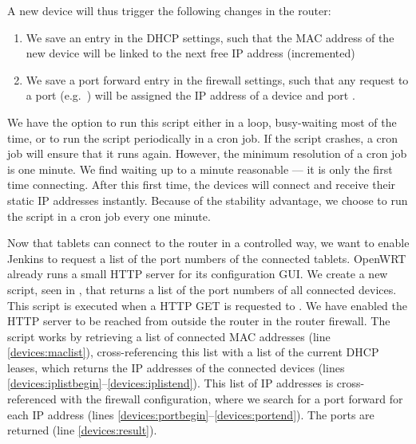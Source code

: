 A new device will thus trigger the following changes in the router:
\begin{enumerate}
  \item We save an entry in the DHCP settings, such that the MAC address of the new device will be linked to the next free IP address (incremented)
  \item We save a port forward entry in the firewall settings, such that any request to a port (e.g.\ ) will be assigned the IP address of a device and port .
\end{enumerate}

We have the option to run this script either in a loop, busy-waiting most of the time, or to run the script periodically in a cron job. If the script crashes, a cron job will ensure that it runs again. However, the minimum resolution of a cron job is one minute. We find waiting up to a minute reasonable --- it is only the first time connecting. After this first time, the devices will connect and receive their static IP addresses instantly. Because of the stability advantage, we choose to run the script in a cron job every one minute.




Now that tablets can connect to the router in a controlled way, we want to enable Jenkins to request a list of the port numbers of the connected tablets. OpenWRT already runs a small HTTP server for its configuration GUI\@. We create a new script, seen in , that returns a list of the port numbers of all connected devices. This script is executed when a HTTP GET is requested to . We have enabled the HTTP server to be reached from outside the router in the router firewall. The script works by retrieving a list of connected MAC addresses (line \ref{devices:maclist}), cross-referencing this list with a list of the current DHCP leases, which returns the IP addresses of the connected devices (lines \ref{devices:iplistbegin}--\ref{devices:iplistend}). This list of IP addresses is cross-referenced with the firewall configuration, where we search for a port forward for each IP address (lines \ref{devices:portbegin}--\ref{devices:portend}). The ports are returned (line \ref{devices:result}).

